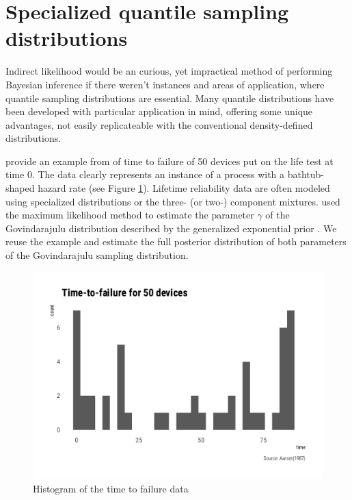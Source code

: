 \documentclass[
  12pt,
]{article}
\begin{document}
\hypertarget{specialized-quantile-sampling-distributions}{%
\section{Specialized quantile sampling distributions}\label{specialized-quantile-sampling-distributions}}

Indirect likelihood would be an curious, yet impractical method of performing Bayesian inference if there weren't instances and areas of application, where quantile sampling distributions are essential. Many quantile distributions have been developed with particular application in mind, offering some unique advantages, not easily replicateable with the conventional density-defined distributions.

\citet{nair2020BayesianInferenceQuantile} provide an example from \citet{aarset1987HowIdentifyBathtub} of time to failure of 50 devices put on the life test at time 0. The data clearly represents an instance of a process with a bathtub-shaped hazard rate (see Figure \ref{fig:bathtub-hist}). Lifetime reliability data are often modeled using specialized distributions \citep{nadarajah2009BathtubshapedFailureRate} or the three- (or two-) component mixtures. \citet{nair2020BayesianInferenceQuantile} used the maximum likelihood method to estimate the parameter \(\gamma\) of the Govindarajulu distribution \citep{nair2012GovindarajuluDistributionProperties} described by the generalized exponential prior \citep{gupta2007GeneralizedExponentialDistribution}. We reuse the \citet{aarset1987HowIdentifyBathtub} example and estimate the full posterior distribution of both parameters of the Govindarajulu sampling distribution.

\begin{figure}

{\centering \includegraphics[width=0.5\linewidth]{ilbm_article_files/figure-latex/bathtub-hist-1} 

}

\caption{Histogram of the time to failure data}\label{fig:bathtub-hist}
\end{figure}
\end{document}

